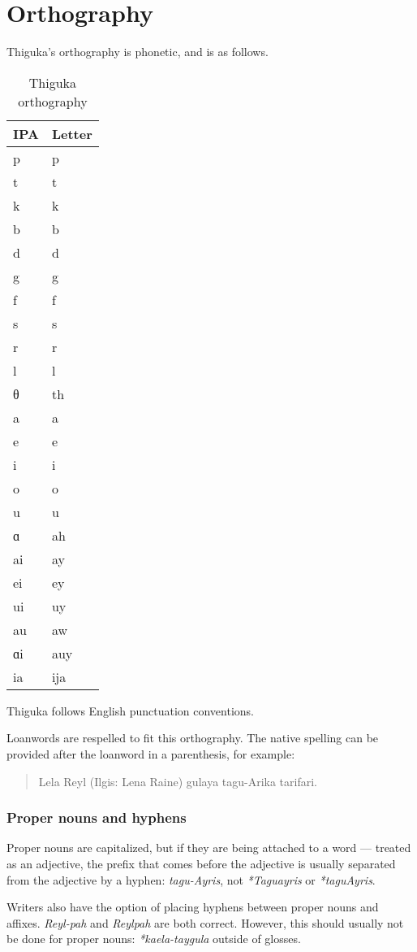 
\chapter{Orthography}
Thiguka's orthography is phonetic, and is as follows.

\begin{table}[h!]
    \centering
    \caption{Thiguka orthography}
    \begin{tabularx}{4cm}{|X|X|}
        \hline
        \textbf{IPA} & \textbf{Letter} \\
        \hline
        p & p \\
        t & t \\
        k & k \\
        b & b \\
        d & d \\
        g & g \\
        f & f \\
        s & s \\
        r & r \\
        l & l \\
        θ & th \\
        a & a \\
        e & e \\
        i & i \\
        o & o \\
        u & u \\
        ɑ & ah \\
        ai & ay \\
        ei & ey \\
        ui & uy \\
        au & aw \\
        ɑi & auy \\
        ia & ija \\
        \hline
    \end{tabularx}
\end{table}

Thiguka follows English punctuation conventions.  

Loanwords are respelled to fit this orthography. The native spelling can be provided after the loanword in a parenthesis, for example:

\begin{quotation}
    Lela Reyl (Ilgis: Lena Raine) gulaya tagu-Arika tarifari.
\end{quotation}

\subsection{Proper nouns and hyphens}
Proper nouns are capitalized, but if they are being attached to a word --- treated as an adjective, the prefix that comes before the adjective is usually separated from the adjective by a hyphen: \emph{tagu-Ayris}, not \emph{*Taguayris} or \emph{*taguAyris}.

Writers also have the option of placing hyphens between proper nouns and affixes. \emph{Reyl-pah} and \emph{Reylpah} are both correct. However, this should usually not be done for proper nouns: \emph{*kaela-taygula} outside of glosses.
